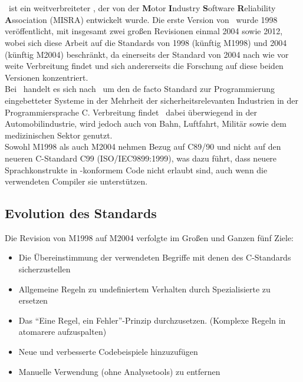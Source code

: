 \documentclass[a4paper,UKenglish,cleveref, autoref]{templates/lipics-v2019}
\begin{document}
    \section{\misra}
    \label{sec:misra-c}
    \misra\ ist ein weitverbreiteter \sqs,
    der von der \textbf{M}otor \textbf{I}ndustry \textbf{S}oftware \textbf{R}eliability \textbf{A}ssociation (MISRA) entwickelt wurde.
    Die erste Version von \misra\ wurde 1998 veröffentlicht, mit insgesamt zwei großen Revisionen einmal 2004 sowie 2012,
    wobei sich diese Arbeit auf die Standards von 1998 (künftig M1998) und 2004 (künftig M2004) beschränkt,
    da einerseits der Standard von 2004 nach wie vor weite Verbreitung findet und sich andererseits die Forschung
    auf diese beiden Versionen konzentriert.\\
    Bei \misra\ handelt es sich nach~\cite{misra-website} um den de facto Standard zur Programmierung eingebetteter Systeme
    in der Mehrheit der sicherheitsrelevanten Industrien in der Programmiersprache C\@.
    Verbreitung findet \misra\ dabei überwiegend in der Automobilindustrie, wird jedoch auch von Bahn, Luftfahrt, Militär
    sowie dem medizinischen Sektor genutzt.\\
    Sowohl M1998 als auch M2004 nehmen Bezug auf C89/90 und nicht auf den neueren C-Standard C99 (ISO/IEC9899:1999),
    was dazu führt, dass neuere Sprachkonstrukte in \misra-konformem Code nicht erlaubt sind,
    auch wenn die verwendeten Compiler sie unterstützen.

    \subsection{Evolution des Standards}
    \label{subsec:evolution-des-standards}
    Die Revision von M1998 auf M2004 verfolgte im Großen und Ganzen fünf Ziele:

    \begin{itemize}
        \item Die Übereinstimmung der verwendeten Begriffe mit denen des C-Standards sicherzustellen
        \item Allgemeine Regeln zu undefiniertem Verhalten durch Spezialisierte zu ersetzen
        \item Das \enquote{Eine Regel, ein Fehler}-Prinzip durchzusetzen.
            (Komplexe Regeln in atomarere aufzuspalten)
        \item Neue und verbesserte Codebeispiele hinzuzufügen
        \item Manuelle Verwendung (ohne Analysetools) zu entfernen
    \end{itemize}
\end{document}
